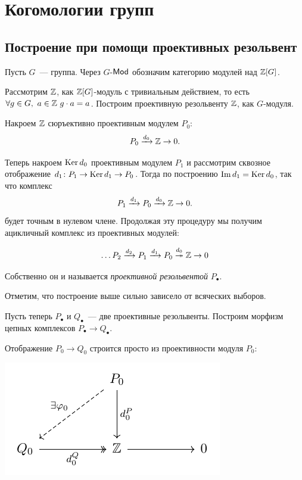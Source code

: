 
	
	\section{Когомологии групп}

	\subsection{Построение при помощи проективных резольвент}

	Пусть $G$~--- группа. Через $G$-$\mathsf{Mod}$ обозначим категорию модулей над $\mathbb{Z}[G]$. 


	Рассмотрим $\mathbb{Z}$, как $\mathbb{Z}[G]$-модуль с тривиальным действием, то есть $\forall g \in G, \ a \in \mathbb{Z} \ g \cdot a = a$. Построим проективную резольвенту $\mathbb{Z}$, как $G$-модуля. 

	Накроем $\mathbb{Z}$ сюръективно проективным модулем $P_0$:
	\[
		P_0 \xrightarrow{d_0} \mathbb{Z} \to 0.
	\]

	Теперь накроем $\operatorname{Ker}{d_0}$  проективным модулем $P_1$ и рассмотрим сквозное отображение $d_1\colon P_1 \to \operatorname{Ker}{d_1} \to P_0$. Тогда по построению $\mathop{\mathrm{Im}}\nolimits{d_1} = \operatorname{Ker}{d_0}$, так что комплекс 
	\[
		P_1 \xrightarrow{d_1} P_0 \xrightarrow{d_0} \mathbb{Z} \to 0.
	\]
	будет точным в нулевом члене. Продолжая эту процедуру мы получим ацикличный комплекс из проективных модулей: 

	\[
		\ldots P_2 \xrightarrow{d_2} P_1 \xrightarrow{d_1} P_0 \overset{d_0}{\twoheadrightarrow} \mathbb{Z} \to 0
	\]

	Собственно он и называется \emph{проективной резольвентой} $P_{\bullet}$. 

	\begin{remark}
		Отметим, что построение выше сильно зависело от всяческих выборов. 
	\end{remark}

	Пусть теперь $P_{\bullet}$ и $Q_{\bullet}$~--- две проективные резольвенты. Построим морфизм цепных комплексов $P_{\bullet} \to Q_{\bullet}$.

	Отображение $P_0 \to Q_0$ строится просто из проективности модуля $P_0$: 

	\begin{center}
		\includegraphics{lectures/6/pictures/cd_1.pdf}
	\end{center}


